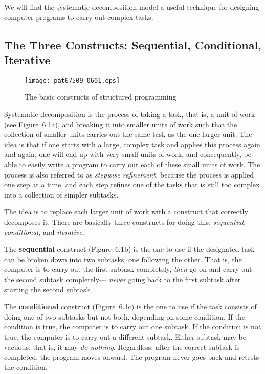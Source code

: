\documentclass{patt}
\begin{document}
We will find the systematic decomposition model a useful technique
for designing computer programs to carry out complex tasks.

\subsection{The Three Constructs: Sequential, Conditional, Iterative}


\begin{figure}[b]
\vspace{-6pt}
\centerline{\texttt{[image: pat67509\_0601.eps]}}
\caption{The basic constructs of structured
programming}
\label{fig:structured_prog}
\end{figure}

Systematic decomposition is the process of taking a task, that is,
a unit of work (see Figure~6.1a), and breaking it into
smaller units of work such that the collection of smaller units
carries out the same task as the one larger unit.  The idea is
that if one starts with a large, complex task and applies this
process again and again, one will end up with very small units of
work, and consequently, be able to easily write a program to carry
out each of these small units of work. The process is also
referred to as {\em stepwise refinement,}  because the process is applied one step at a time, and
each step refines one of the tasks that is still too complex into
a collection of simpler subtasks.

The idea is to replace each larger unit of work with a construct
that correctly decomposes it.  There are basically three
constructs for doing this: {\em sequential, conditional,} and {\em
iterative}.

The {\bf sequential} construct (Figure~6.1b) is the one to use if
the designated task can be 
broken down into two subtasks, one following the other. That is, the
computer is to carry out the first subtask completely, {\em then} go
on and carry out the second subtask completely--- {\em never} going back
to the first subtask after starting the second subtask.

The {\bf conditional} construct (Figure~6.1c) is the one to use if
the task consists of
doing one of two subtasks but not both, depending on some condition.
If the condition is true, the computer is to carry out one subtask.
If the condition is not true, the computer is to carry out a different
subtask. Either subtask may be vacuous, that is, 
it may {\em do nothing}.  
Regardless, after the correct subtask is completed, the
program moves onward. The program never goes back and retests the
condition.
\end{document}
